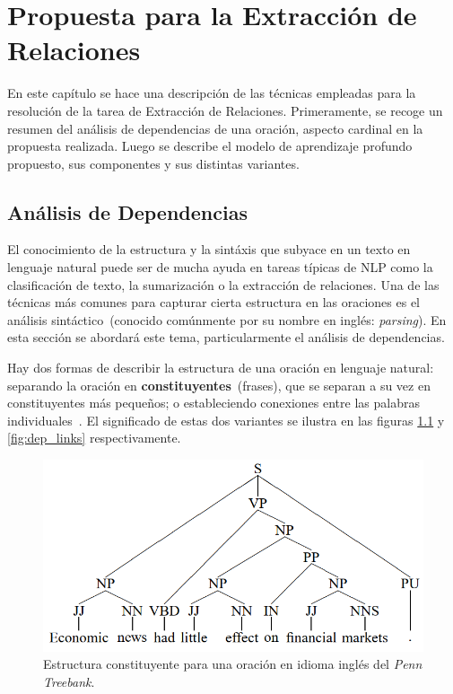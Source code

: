 \chapter{Propuesta para la Extracción de Relaciones}\label{chapter:relations}

En este capítulo se hace una descripción de las técnicas empleadas para la resolución de la tarea de Extracción de Relaciones. Primeramente, se recoge un resumen del análisis de dependencias de una oración, aspecto cardinal en la propuesta realizada. Luego se describe el modelo de aprendizaje profundo propuesto, sus componentes y sus distintas variantes.


\section{Análisis de Dependencias}\label{sec:parsing}

El conocimiento de la estructura y la sintáxis que subyace en un texto en lenguaje natural puede ser de mucha ayuda en tareas típicas de NLP como la clasificación de texto, la sumarización o la extracción de relaciones. Una de las técnicas más comunes para capturar cierta estructura en las oraciones es el análisis sintáctico~(conocido comúnmente por su nombre en inglés: \emph{parsing}). En esta sección se abordará este tema, particularmente el análisis de dependencias.

Hay dos formas de describir la estructura de una oración en lenguaje natural: separando la oración en \textbf{constituyentes}~(frases), que se separan a su vez en constituyentes más pequeños; o estableciendo conexiones entre las palabras individuales~\cite{covington2001fundamental}. El significado de estas dos variantes se ilustra en las figuras \ref{fig:dep_const} y \ref{fig:dep_links} respectivamente.

\begin{figure}[h!]
	\centering
	\includegraphics[width=0.8\linewidth]{Graphics/dep_const.png}
	\caption{Estructura constituyente para una oración en idioma inglés del \emph{Penn Treebank}.}\label{fig:dep_const}
\end{figure}

